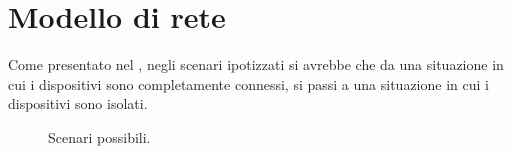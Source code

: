 \section{Modello di rete}
Come presentato nel , negli scenari ipotizzati si avrebbe che da una situazione in cui i dispositivi sono completamente connessi, si passi a una situazione in cui i dispositivi sono isolati.
\begin{figure}[t]
	\hfill
	\caption{Scenari possibili.}
	\label{fig:scenari_possibili}
\end{figure}
